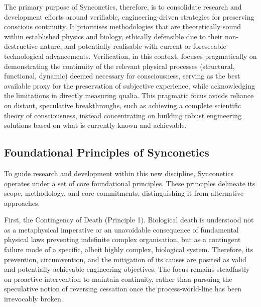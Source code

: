 \documentclass[10pt]{article}
\begin{document}
\begin{sloppypar}
  The primary purpose of Synconetics, therefore, is to consolidate research and development efforts around verifiable, engineering-driven strategies for preserving conscious continuity. It prioritises methodologies that are theoretically sound within established physics and biology, ethically defensible due to their non-destructive nature, and potentially realisable with current or foreseeable technological advancements. Verification, in this context, focuses pragmatically on demonstrating the continuity of the relevant physical processes (structural, functional, dynamic) deemed necessary for consciousness, serving as the best available proxy for the preservation of subjective experience, while acknowledging the limitations in directly measuring qualia. This pragmatic focus avoids reliance on distant, speculative breakthroughs, such as achieving a complete scientific theory of consciousness, instead concentrating on building robust engineering solutions based on what is currently known and achievable.

  \subsection{Foundational Principles of Synconetics}
  \label{sec:foundational-principles}

  To guide research and development within this new discipline, Synconetics operates under a set of core foundational principles. These principles delineate its scope, methodology, and core commitments, distinguishing it from alternative approaches.

  First, the Contingency of Death (Principle 1). Biological death is understood not as a metaphysical imperative or an unavoidable consequence of fundamental physical laws preventing indefinite complex organisation, but as a contingent failure mode of a specific, albeit highly complex, biological system. Therefore, its prevention, circumvention, and the mitigation of its causes are posited as valid and potentially achievable engineering objectives. The focus remains steadfastly on proactive intervention to maintain continuity, rather than pursuing the speculative notion of reversing cessation once the process-world-line has been irrevocably broken.


\end{sloppypar}
\end{document}
